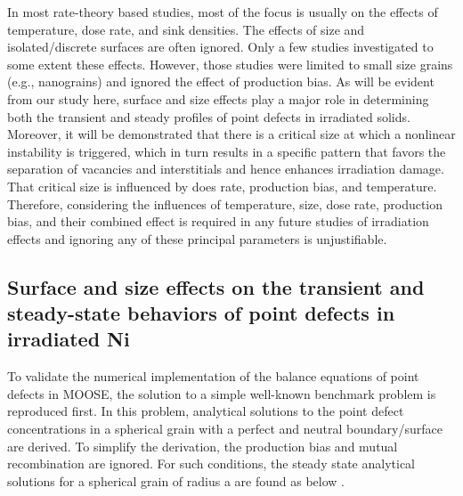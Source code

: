 \documentclass[utf8]{frontiersSCNS} %
\begin{document}
    In most rate-theory based studies, most of the focus is usually on the effects of temperature, dose rate, and sink densities. The effects of size and isolated/discrete surfaces are often ignored. Only a few studies \citep{yang2010,demkowicz2011} investigated to some extent these effects. However, those studies were limited to small size grains (e.g., nanograins) and ignored the effect of production bias. As will be evident from our study here, surface and size effects play a major role in determining both the transient and steady profiles of point defects in irradiated solids. Moreover, it will be demonstrated that there is a critical size at which a nonlinear instability is triggered, which in turn results in a specific pattern that favors the separation of vacancies and interstitials and hence enhances irradiation damage. That critical size is influenced by does rate, production bias, and temperature. Therefore, considering the influences of temperature, size, dose rate, production bias, and their combined effect is required in any future studies of irradiation effects and ignoring any of these principal parameters is unjustifiable.\\

\subsection{Surface and size effects on the transient and steady-state behaviors of point defects in irradiated Ni}

To validate the numerical implementation of the balance equations of point defects in MOOSE, the solution to a simple well-known benchmark problem is reproduced first. In this problem, analytical solutions to the point defect concentrations in a spherical grain with a perfect and neutral boundary/surface are derived. To simplify the derivation, the production bias and mutual recombination are ignored. For such conditions, the steady state analytical solutions for a spherical grain of radius a are found as below \citep{heald1977}.
\end{document}
